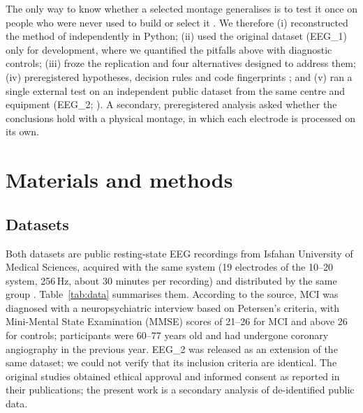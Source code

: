 The only way to know whether a selected montage generalises is to test it once on people who were never used to build or select it \citep{collins2024}. We therefore (i) reconstructed the method of \citet{aljalal2024} independently in Python; (ii) used the original dataset (EEG\_1) only for development, where we quantified the pitfalls above with diagnostic controls; (iii) froze the replication and four alternatives designed to address them; (iv) preregistered hypotheses, decision rules and code fingerprints \citep{nosek2018,osfprereg}; and (v) ran a single external test on an independent public dataset from the same centre and equipment (EEG\_2; \citealp{kashefpoor2019}). A secondary, preregistered analysis asked whether the conclusions hold with a physical montage, in which each electrode is processed on its own.

\section{Materials and methods}

\subsection{Datasets}

Both datasets are public resting-state EEG recordings from Isfahan University of Medical Sciences, acquired with the same system (19 electrodes of the 10--20 system, 256\,Hz, about 30 minutes per recording) and distributed by the same group \citep{kashefpoor2016,kashefpoor2019}. Table~\ref{tab:data} summarises them. According to the source, MCI was diagnosed with a neuropsychiatric interview based on Petersen's criteria, with Mini-Mental State Examination (MMSE) scores of 21--26 for MCI and above 26 for controls; participants were 60--77 years old and had undergone coronary angiography in the previous year. EEG\_2 was released as an extension of the same dataset; we could not verify that its inclusion criteria are identical. The original studies obtained ethical approval and informed consent as reported in their publications; the present work is a secondary analysis of de-identified public data.

